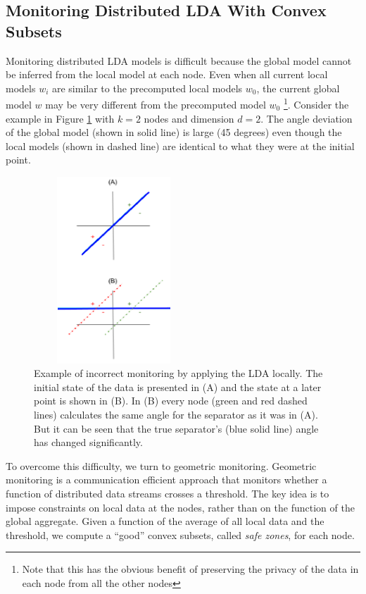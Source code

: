 \documentclass{sig-alternate-05-2015}
\begin{document}
\subsection{Monitoring Distributed LDA With Convex Subsets}
Monitoring distributed LDA models is difficult because the
global model cannot be inferred from the local model at each
node. Even when all current local models $w_i$ are similar to the precomputed
local models $w_0$, the current global model $w$ may
be very different from the precomputed model $w_0$
\footnote{Note that this has the obvious benefit of preserving the privacy 
of the data in each node from all the other nodes}. 
Consider the example in Figure \ref{NegativeExample} with $k = 2$ nodes 
and dimension $d =2$. 
The angle deviation of the global model (shown in solid line) is large (45 degrees) 
even though the local models (shown in dashed line) are identical to what they 
were at the initial point.

\begin{figure}[h]
\centering
\includegraphics[width=60mm, height=7cm]{NegativeExample.png}
\caption{Example of incorrect monitoring by applying the LDA locally. The
initial state of the data is presented in (A) and the state at a later point
is shown in (B). In (B) every node (green and red dashed lines) calculates the same angle
for the separator as it was in (A). But it can be
seen that the true separator's (blue solid line) angle has changed
significantly.}
\label{NegativeExample}
\end{figure}


\par To overcome this difficulty, we turn to geometric monitoring. Geometric
monitoring \cite{keren2014geometric, keren2012shape} is a communication
efficient approach that monitors whether a function of distributed
data streams crosses a threshold. The key idea is to
impose constraints on local data at the nodes, rather than
on the function of the global aggregate. Given a function of
the average of all local data and the threshold, we compute a
``good'' convex subsets, called \textit{safe zones}, for each
node.
\end{document}
